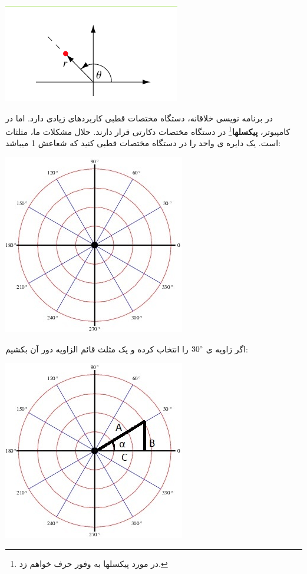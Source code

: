 \documentclass[14pt,a4paper]{memoir}
\begin{document}
	 
	 
	 	  \begin{center}
	 	\includegraphics[scale=1]{Polar}
	 \end{center}
 
 در برنامه نویسی خلاقانه، دستگاه مختصات قطبی کاربردهای زیادی دارد. اما در کامپیوتر، \textbf{پیکسلها}\footnote{در مورد پیکسلها به وفور حرف خواهم زد.} در دستگاه مختصات دکارتی قرار دارند. حلال مشکلات ما، مثلثات است.
 یک دایره ی واحد را در دستگاه مختصات  قطبی کنید که شعاعش 1 میباشد:
  \begin{center}
 	\includegraphics[scale=1]{UnitCIrcle}
 \end{center}

اگر زاویه ی $   30\degree   $ را انتخاب کرده و یک مثلث قائم الزاویه دور آن بکشیم:


	   \begin{center}
	 	\includegraphics[scale=1]{ThirtyDegrees}
	 \end{center}
	 
\end{document}
